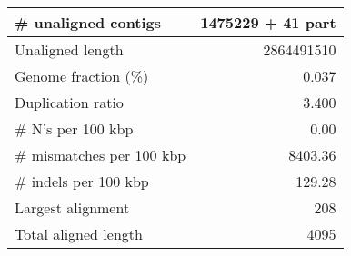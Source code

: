 \documentclass[12pt,a4paper]{article}
\begin{document}
\begin{table}[ht]
\begin{center}
\begin{tabular}{|l*{1}{|r}|}
\# unaligned contigs & 1475229 + 41 part \\ \hline
Unaligned length & 2864491510 \\ \hline
Genome fraction (\%) & 0.037 \\ \hline
Duplication ratio & 3.400 \\ \hline
\# N's per 100 kbp & 0.00 \\ \hline
\# mismatches per 100 kbp & 8403.36 \\ \hline
\# indels per 100 kbp & 129.28 \\ \hline
Largest alignment & 208 \\ \hline
Total aligned length & 4095 \\ \hline
\end{tabular}
\end{center}
\end{table}
\end{document}
